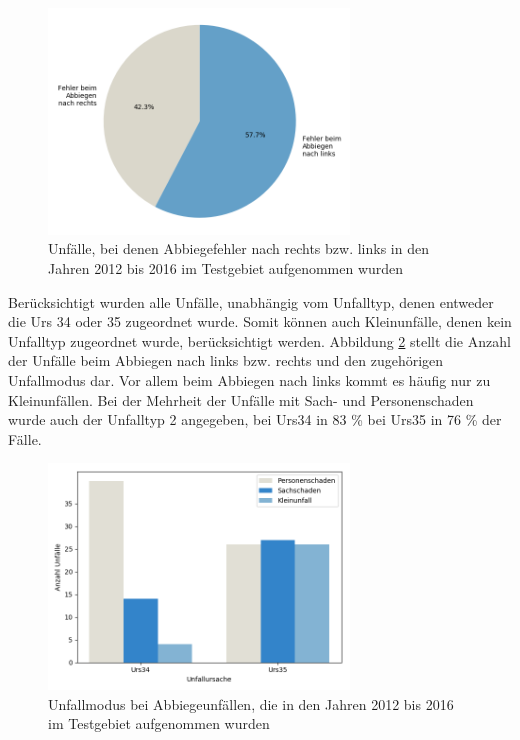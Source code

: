 \begin{savenotes}
	\begin{figure}[H]
		\centering
		\includegraphics[width=8cm,height=6cm]{figures/These_1}
		\caption[Unfälle, bei denen Abbiegefehler nach rechts bzw. links in den Jahren 2012 bis 2016 im Testgebiet aufgenommen wurden]{Unfälle, bei denen Abbiegefehler nach rechts bzw. links in den Jahren 2012 bis 2016 im Testgebiet aufgenommen wurden}\label{fig:Abbiegen_rechts_links}
	\end{figure}
\end{savenotes}

Berücksichtigt wurden alle Unfälle, unabhängig vom Unfalltyp, denen entweder die \ac{Urs} 34 oder 35 zugeordnet wurde. Somit können auch Kleinunfälle, denen kein Unfalltyp zugeordnet wurde, berücksichtigt werden. Abbildung \ref{fig:Abbiegen_Md} stellt die Anzahl der Unfälle beim Abbiegen nach links bzw. rechts und den zugehörigen Unfallmodus dar. Vor allem beim Abbiegen nach links kommt es häufig nur zu Kleinunfällen.
Bei der Mehrheit der Unfälle mit Sach- und Personenschaden wurde auch der Unfalltyp 2 angegeben, bei Urs34 in 83 \% bei Urs35 in 76 \% der Fälle.

\begin{savenotes}
	\begin{figure}[H]
		\centering
		\includegraphics[width=8cm,height=6cm]{figures/Abbiegen_Md}
		\caption[Unfallmodus bei Abbiegeunfällen, die in den Jahren 2012 bis 2016 im Testgebiet aufgenommen wurden]{Unfallmodus bei Abbiegeunfällen, die in den Jahren 2012 bis 2016 im Testgebiet aufgenommen wurden}\label{fig:Abbiegen_Md}
	\end{figure}
\end{savenotes}

